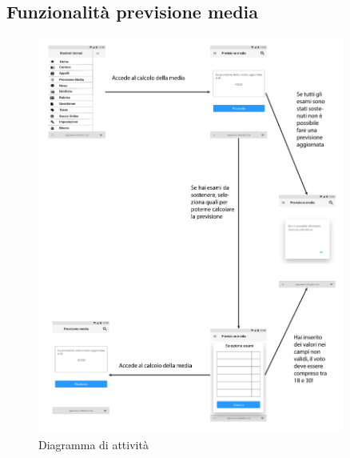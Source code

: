 \subsection{Funzionalità previsione media}
\begin{figure}[H]
	\centering
	\includegraphics[width=0.9\textwidth]{imgs/gruppo3/media-activity-diagram.pdf}
	\caption{Diagramma di attività}
	\label{fig:act-rubrica}
\end{figure}

\clearpage
